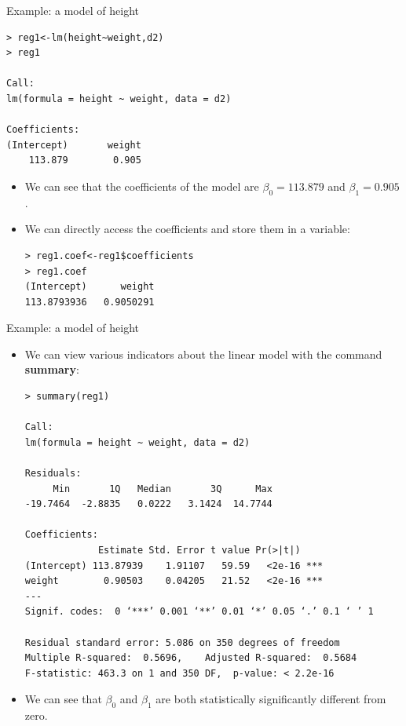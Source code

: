 \documentclass[handout]{beamer}
\begin{document}
\begin{frame}[fragile]{Example: a model of height}
\scriptsize{
\begin{verbatim}
> reg1<-lm(height~weight,d2)
> reg1

Call:
lm(formula = height ~ weight, data = d2)

Coefficients:
(Intercept)       weight  
    113.879        0.905  
\end{verbatim}

\begin{itemize}




 \item We can see that the coefficients of the model are $\beta_{0}=113.879$ and $\beta_{1}=0.905$. 


 \item We can directly access the coefficients and store them in a variable:
 \begin{verbatim}
> reg1.coef<-reg1$coefficients
> reg1.coef
(Intercept)      weight 
113.8793936   0.9050291 
 \end{verbatim}

 
 \end{itemize}
 
 


} 
\end{frame}


\begin{frame}[fragile]{Example: a model of height}
\scriptsize{


\begin{itemize}


\item We can view various indicators about the linear model with the command \textbf{summary}:
 
\begin{verbatim}
> summary(reg1)

Call:
lm(formula = height ~ weight, data = d2)

Residuals:
     Min       1Q   Median       3Q      Max 
-19.7464  -2.8835   0.0222   3.1424  14.7744 

Coefficients:
             Estimate Std. Error t value Pr(>|t|)    
(Intercept) 113.87939    1.91107   59.59   <2e-16 ***
weight        0.90503    0.04205   21.52   <2e-16 ***
---
Signif. codes:  0 ‘***’ 0.001 ‘**’ 0.01 ‘*’ 0.05 ‘.’ 0.1 ‘ ’ 1

Residual standard error: 5.086 on 350 degrees of freedom
Multiple R-squared:  0.5696,	Adjusted R-squared:  0.5684 
F-statistic: 463.3 on 1 and 350 DF,  p-value: < 2.2e-16

\end{verbatim}
\item We can see that $\beta_0$ and $\beta_1$ are both statistically significantly different from zero.  
 
 \end{itemize}
 
 


} 
\end{frame}
\end{document}

